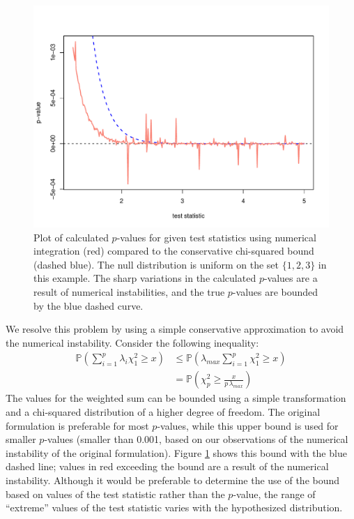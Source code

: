 \begin{figure}
\begin{center}
\includegraphics[scale=0.4]{fig1.pdf}
\end{center}
\caption{Plot of calculated $p$-values for given test statistics
using numerical integration
(red) compared to the conservative chi-squared bound (dashed blue). 
The null distribution is uniform on the set $\{1,2,3\}$ in this example.
The sharp variations in the calculated $p$-values are a result of numerical
instabilities, and the true $p$-values are bounded by the blue dashed curve.}
\label{cvmissues}
\end{figure}

We resolve this problem by using a simple conservative approximation to
avoid the numerical instability. Consider the
following inequality:
\begin{align}
\mathbb{P} \left(\sum_{i=1}^{p} \lambda_i \chi^2_1 \geq x \right) &\leq \mathbb{P} \left( \lambda_{max} \sum_{i=1}^{p} \chi^2_1 \geq x \right) \label{ineq1} \\
&= \mathbb{P} \left(\chi^2_p \geq \frac{x}{p \, \lambda_{max}} \right)
\label{ineq2}
\end{align}
The values for the weighted sum can be bounded using a simple transformation
and a chi-squared distribution of a higher degree of freedom. 
The original formulation is preferable for most $p$-values, while
this upper bound is used for smaller $p$-values (smaller than 0.001,
based on our observations of the numerical instability of the original
formulation).  Figure \ref{cvmissues} shows this bound with the blue dashed
line; values in red exceeding the bound are a result of the numerical
instability.  Although it would be preferable to determine the use of
the bound based on values of the test statistic rather than the $p$-value,
the range of ``extreme'' values of the test statistic varies with the
hypothesized distribution.

